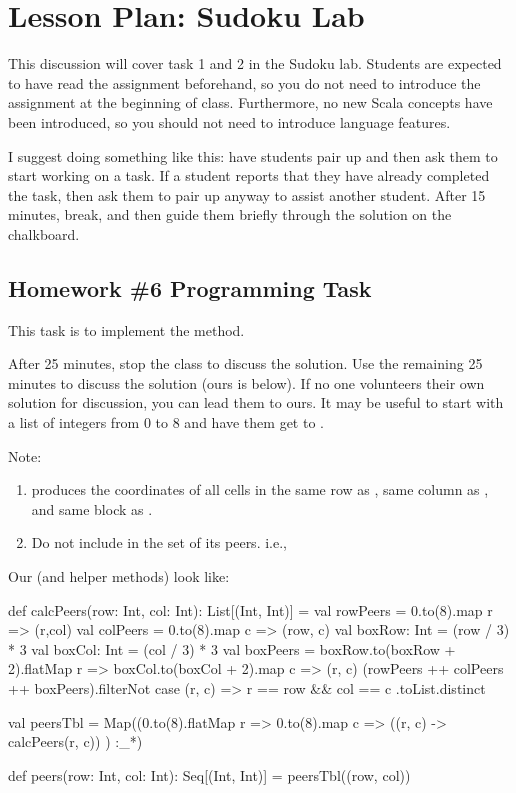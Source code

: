 \documentclass[9pt]{extbook}
\begin{document}
\chapter{Lesson Plan: Sudoku Lab}

This discussion will cover task 1 and 2 in the Sudoku lab. Students are
expected to have read the assignment beforehand, so you do not need to
introduce the assignment at the beginning of class.  Furthermore, no new
Scala concepts have been introduced, so you should not need to introduce
language features.

I suggest doing something like this:  have students pair up and then ask
them to start working on a task.  If a student reports that they have
already completed the task, then ask them to pair up anyway to assist
another student.  After 15 minutes, break, and then guide them briefly
through the solution on the chalkboard.

\section{Homework \#6 Programming Task}

This task is to implement the  method.

After 25 minutes, stop the class to discuss the solution. Use the
remaining 25 minutes to discuss the solution (ours is below). If no one
volunteers their own solution for discussion, you can lead them to ours.
It may be useful to start with a list of integers from 0 to 8 and have
them get to .

Note: 

\begin{enumerate}
  \item {} produces the coordinates of all cells in the same
    row as , same column as , and same block as 
    . 
  \item Do not include  in the set of its peers. i.e., 
\end{enumerate}

Our  (and helper methods) look like:

\begin{scalacode}
  def calcPeers(row: Int, col: Int): List[(Int, Int)] = {
    val rowPeers = 0.to(8).map { r => (r,col) }
    val colPeers = 0.to(8).map { c => (row, c) }
    val boxRow: Int = (row / 3) * 3
    val boxCol: Int = (col / 3) * 3
    val boxPeers = boxRow.to(boxRow + 2).flatMap { r =>
      boxCol.to(boxCol + 2).map { c =>
        (r, c)
      }
    }
    (rowPeers ++ colPeers ++ boxPeers).filterNot {
      case (r, c) => r == row && col == c
    }.toList.distinct
  }

  val peersTbl = Map((0.to(8).flatMap { r =>
    0.to(8).map { c =>
      ((r, c) -> calcPeers(r, c))
    }
  }) :_*)

  def peers(row: Int, col: Int): Seq[(Int, Int)] = peersTbl((row, col))
\end{scalacode}
\end{document}
